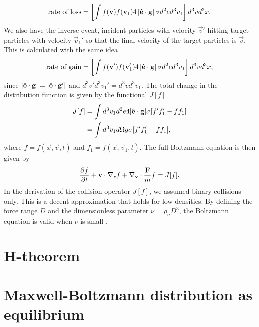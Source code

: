 \begin{align}
	\text{rate of loss} = \left[\int f(\mathbf v)f(\mathbf v_1)4\left|\hat {\mathbf{e}} \cdot \mathbf g \right|\sigma d^2 ed^3 v_1\right]d^3 vd^3 x.
\end{align}
We also have the inverse event, incident particles with velocity $\vec v'$ hitting target particles with velocity $\vec v_1'$ so that the final velocity of the target particles is $\vec v$. This is calculated with the same idea
\begin{align}
	\text{rate of gain} = \left[\int f(\mathbf v')f(\mathbf v_1')4\left|\hat {\mathbf{e}} \cdot \mathbf g \right|\sigma d^2 ed^3 v_1\right]d^3 vd^3 x,
\end{align}
since $|\hat {\mathbf{e}}\cdot \mathbf g| = |\hat {\mathbf{e}}\cdot \mathbf g'|$ and $d^3 v'd^3 v_1' = d^3 vd^3 v_1$. The total change in the distribution function is given by the functional $J[f]$
\begin{align}
	J[f] &= \int d^3 v_1 d^2 e4|\hat {\mathbf{e}}\cdot\mathbf g|\sigma[f'f_1' - ff_1]\\
	&= \int d^3 v_1 d\Omega g \sigma[f'f_1' - ff_1],
\end{align}
where $f = f(\vec x, \vec v, t)$ and $f_1 = f(\vec x, \vec v_1, t)$. The full Boltzmann equation is then given by
\begin{align}
	\label{eq:boltzmann_equation}
	\frac{\partial f}{\partial t} + \mathbf v\cdot \nabla_\mathbf r f + \nabla_\mathbf v\cdot{\mathbf F\over m} f = J[f].
\end{align}
In the derivation of the collision operator $J[f]$, we assumed binary collisions only. This is a decent approximation that holds for low densities. By defining the force range $D$ and the dimensionless parameter $\nu = \rho_n D^3$, the Boltzmann equation is valid when $\nu$ is small \cite{mclennan1989introduction}. 
\section{H-theorem}
\section{Maxwell-Boltzmann distribution as equilibrium}
